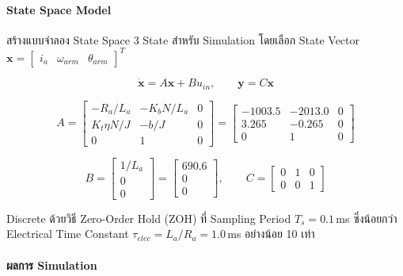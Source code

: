\paragraph{State Space Model}

สร้างแบบจำลอง State Space 3 State สำหรับ Simulation
โดยเลือก State Vector $\mathbf{x} = \begin{bmatrix} i_a & \omega_{arm} & \theta_{arm} \end{bmatrix}^T$

\begin{equation}
  \dot{\mathbf{x}} = A\mathbf{x} + Bu_{in}, \qquad \mathbf{y} = C\mathbf{x}
  \label{eq:ss}
\end{equation}

\begin{equation}
  A = \begin{bmatrix}
        -R_a/L_a       & -K_b N/L_a & 0 \\
        K_t\eta N/J    & -b/J       & 0 \\
        0              & 1          & 0
      \end{bmatrix}
    = \begin{bmatrix}
        -1003.5 & -2013.0 & 0 \\
        3.265   & -0.265  & 0 \\
        0       & 1       & 0
      \end{bmatrix}
  \label{eq:A_matrix}
\end{equation}

\begin{equation}
  B = \begin{bmatrix} 1/L_a \\ 0 \\ 0 \end{bmatrix}
    = \begin{bmatrix} 690.6 \\ 0 \\ 0 \end{bmatrix}, \qquad
  C = \begin{bmatrix} 0 & 1 & 0 \\ 0 & 0 & 1 \end{bmatrix}
  \label{eq:BC_matrix}
\end{equation}

Discrete ด้วยวิธี Zero-Order Hold (ZOH) ที่ Sampling Period $T_s = 0.1$\,ms
ซึ่งน้อยกว่า Electrical Time Constant $\tau_{elec} = L_a/R_a = 1.0$\,ms อย่างน้อย 10 เท่า

\paragraph{ผลการ Simulation}

